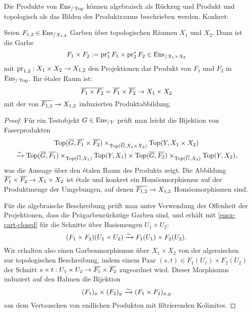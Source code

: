 Die Produkte von $\operatorname{Ens}_{/\operatorname{Top}}$ können algebraisch als Rückzug und Produkt
und topologisch als das Bilden des Produktraums beschrieben
werden. Konkret:
\begin{prop} \label{enstop-prod}
  Seien $F_{1,2} \in \operatorname{Ens}_{/X_{1,2}}$ Garben über topologischen Räumen
  $X_1$ und $X_2$. Dann ist die Garbe
  \[ F_1 \times F_2 := \operatorname{pr}_1^* F_1 \times \operatorname{pr}_2^* F_2 \in \operatorname{Ens}_{/X_1 \times X_2} \]
  mit $\operatorname{pr}_{1,2}: X_1 \times X_2 \to X_{1,2}$ den Projektionen das
  Produkt von $F_1$ und $F_2$ in $\operatorname{Ens}_{/\operatorname{Top}}$. Ihr étaler Raum ist:
  \[ \overline{F_1 \times F_2} = \overline{F_1} \times \overline{F_2}
  \to X_1 \times X_2
  \]
  mit der von $\overline{F_{1,2}} \to X_{1,2}$ induzierten
  Produktabbildung.
\end{prop}
\begin{proof}
  Für ein Testobjekt $G \in \operatorname{Ens}_{/Y}$ prüft man leicht die Bijektion
  von Faserprodukten
  \begin{gather*}
    \operatorname{Top}(\overline{G}, \overline{F_1} \times \overline{F_2})
    \times_{\operatorname{Top}(\overline{G}, X_1 \times X_2)} \operatorname{Top}(Y, X_1 \times X_2) \\
    \xrightarrow[]{\sim}
    \operatorname{Top}(\overline{G}, \overline{F_1})
    \times_{\operatorname{Top}(\overline{G}, X_1)} \operatorname{Top}(Y, X_1)
    \times \operatorname{Top}(\overline{G}, \overline{F_2})
    \times_{\operatorname{Top}(\overline{G}, X_2)} \operatorname{Top}(Y, X_2),
  \end{gather*}
  was die Aussage über den étalen Raum des Produkts zeigt. Die
  Abbildung $\overline{F_1} \times \overline{F_2} \to X_1 \times
  X_2$ ist étale und konkret ein Homöomorphismus auf der Produktmenge
  der Umgebungen, auf denen $\overline{F_{1,2}} \to X_{1,2}$
  Homöomorphismen sind.
  
  Für die algebraische Beschreibung prüft man unter Verwendung der
  Offenheit der Projektionen, dass die Prägarbenrückzüge Garben sind,
  und erhält mit \ref{ensx-cart-closed} für die Schnitte über
  Basismengen $U_1 \times U_2$:
  \[ (F_1 \times F_2)(U_1 \times U_2) \xrightarrow[]{\sim} F_1(U_1) \times F_2(U_2).
  \]
  Wir erhalten also einen Garbenmorphismus über $X_1 \times X_2$ von
  der algeraischen zur topologischen Beschreibung, indem einem Paar
  $(s, t) \in F_1(U_1) \times F_2( U_2)$ der Schnitt $s \times t: U_1
  \times U_2 \to \overline{F_1} \times \overline{F_2}$ zugeordnet
  wird. Dieser Morphismus induziert auf den Halmen die Bijektion
  \[ (F_1)_x \times (F_2)_y \xrightarrow[]{\sim} (F_1 \times F_2)_{x, y} \]
  aus dem Vertauschen von endlichen Produkten mit filtrierenden
  Kolimites.
\end{proof}
